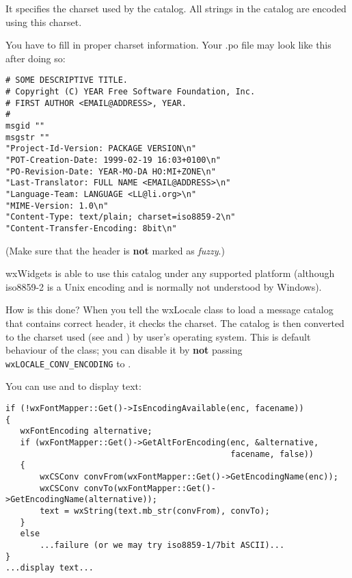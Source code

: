 It specifies the charset used by the catalog. All strings in the catalog
are encoded using this charset.

You have to fill in proper charset information. Your .po file may look like this
after doing so: 

\begin{verbatim}
# SOME DESCRIPTIVE TITLE.
# Copyright (C) YEAR Free Software Foundation, Inc.
# FIRST AUTHOR <EMAIL@ADDRESS>, YEAR.
#
msgid ""
msgstr ""
"Project-Id-Version: PACKAGE VERSION\n"
"POT-Creation-Date: 1999-02-19 16:03+0100\n"
"PO-Revision-Date: YEAR-MO-DA HO:MI+ZONE\n"
"Last-Translator: FULL NAME <EMAIL@ADDRESS>\n"
"Language-Team: LANGUAGE <LL@li.org>\n"
"MIME-Version: 1.0\n"
"Content-Type: text/plain; charset=iso8859-2\n"
"Content-Transfer-Encoding: 8bit\n"
\end{verbatim}

(Make sure that the header is {\bf not} marked as {\it fuzzy}.)

wxWidgets is able to use this catalog under any supported platform
(although iso8859-2 is a Unix encoding and is normally not understood by
Windows).

How is this done? When you tell the wxLocale class to load a message catalog that
contains correct header, it checks the charset. The catalog is then converted
to the charset used (see
 and
) by
user's operating system. This is default behaviour of the
 class; you can disable it by {\bf not} passing
{\tt wxLOCALE\_CONV\_ENCODING} to .


You can use  and 
 to display text:

\begin{verbatim}
if (!wxFontMapper::Get()->IsEncodingAvailable(enc, facename))
{
   wxFontEncoding alternative;
   if (wxFontMapper::Get()->GetAltForEncoding(enc, &alternative,
                                              facename, false))
   {
       wxCSConv convFrom(wxFontMapper::Get()->GetEncodingName(enc));
       wxCSConv convTo(wxFontMapper::Get()->GetEncodingName(alternative));
       text = wxString(text.mb_str(convFrom), convTo);
   }
   else
       ...failure (or we may try iso8859-1/7bit ASCII)...
}
...display text...
\end{verbatim}

